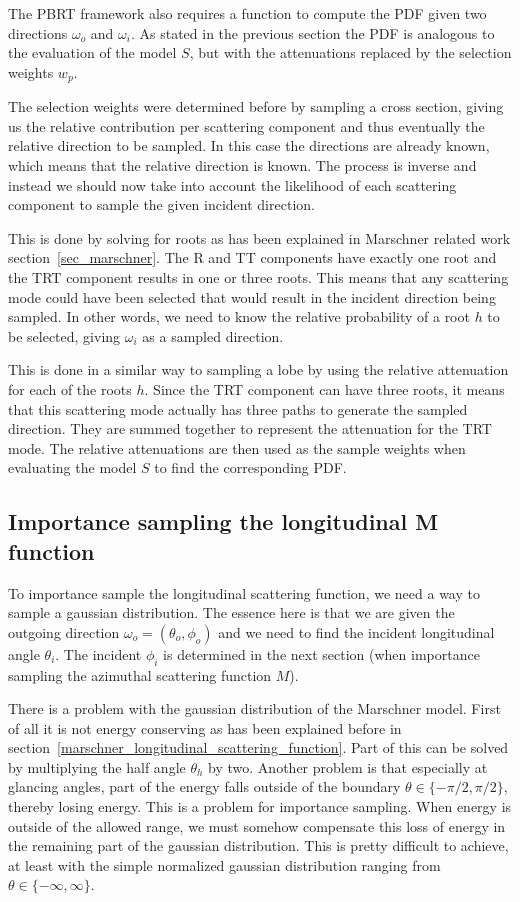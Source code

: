 \documentclass[11pt,a4paper]{report}
\begin{document}
The PBRT framework also requires a function to compute the PDF given two directions $\omega_o$ and $\omega_i$. As stated in the previous section the PDF is analogous to the evaluation of the model $S$, but with the attenuations replaced by the selection weights $w_p$.

The selection weights were determined before by sampling a cross section, giving us the relative contribution per scattering component and thus eventually the relative direction to be sampled. In this case the directions are already known, which means that the relative direction is known. The process is inverse and instead we should now take into account the likelihood of each scattering component to sample the given incident direction.

This is done by solving for roots as has been explained in Marschner related work section~\ref{sec_marschner}. The R and TT components have exactly one root and the TRT component results in one or three roots. This means that any scattering mode could have been selected that would result in the incident direction being sampled. In other words, we need to know the relative probability of a root $h$ to be selected, giving $\omega_i$ as a sampled direction.

This is done in a similar way to sampling a lobe by using the relative attenuation for each of the roots $h$. Since the TRT component can have three roots, it means that this scattering mode actually has three paths to generate the sampled direction. They are summed together to represent the attenuation for the TRT mode. The relative attenuations are then used as the sample weights when evaluating the model $S$ to find the corresponding PDF.


\subsection{Importance sampling the longitudinal M function}
\label{sec_importance_sampling_M}

To importance sample the longitudinal scattering function, we need a way to sample a gaussian distribution. The essence here is that we are given the outgoing direction $\omega_o = (\theta_o, \phi_o)$ and we need to find the incident longitudinal angle $\theta_i$. The incident $\phi_i$ is determined in the next section (when importance sampling the azimuthal scattering function $M$).

There is a problem with the gaussian distribution of the Marschner model. First of all it is not energy conserving as has been explained before in section~\ref{marschner_longitudinal_scattering_function}. Part of this can be solved by multiplying the half angle $\theta_h$ by two. Another problem is that especially at glancing angles, part of the energy falls outside of the boundary $\theta \in \{ -\pi/2, \pi/2 \}$, thereby losing energy. This is a problem for importance sampling. When energy is outside of the allowed range, we must somehow compensate this loss of energy in the remaining part of the gaussian distribution. This is pretty difficult to achieve, at least with the simple normalized gaussian distribution ranging from $\theta \in \{ -\infty, \infty \}$.
\end{document}

